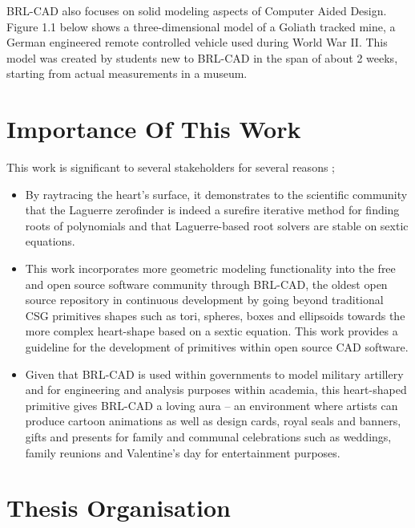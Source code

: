 \hspace{30} BRL­-CAD also focuses on solid modeling aspects of Computer ­Aided
Design. Figure 1.1 below shows a three-­dimensional model of a Goliath tracked
mine, a German engineered remote controlled vehicle used during World War II.
This model was created by students new to BRL-­CAD in the span of about 2
weeks, starting from actual measurements in a museum.


\section{Importance Of This Work}

This work is significant to several stakeholders for several reasons ;

\begin{itemize}
\item By ray­tracing the heart's surface, it demonstrates to the scientific
community that the Laguerre zero­finder is indeed a sure­fire iterative
method for finding roots of polynomials and that Laguerre-­based root 
solvers are stable on sextic equations.
\item This work incorporates more geometric modeling functionality into 
the free and open source software community through BRL-­CAD, the oldest open 
source repository in continuous development \cite{3} by going beyond traditional 
CSG primitives shapes such as tori, spheres, boxes and ellipsoids towards the more
complex heart-shape based on a sextic equation. This work provides a guideline 
for the development of primitives within open source CAD software.
\item Given that BRL­-CAD is used within governments to model military artillery
 and for engineering and analysis purposes within academia, this
heart­-shaped primitive gives BRL-­CAD a loving aura – an 
environment where artists can produce cartoon animations as well as
design cards, royal seals and banners, gifts and presents for family and
communal celebrations such as weddings, family reunions and
Valentine's day for entertainment purposes.
\end{itemize}


\section{Thesis Organisation}

